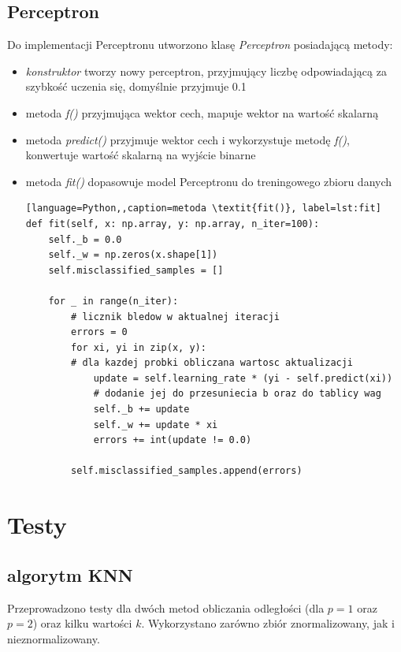 \documentclass[12pt,a4paper]{article}
\begin{document}
        \subsection{Perceptron}
            Do implementacji Perceptronu utworzono klasę \textit{Perceptron} posiadającą metody:
	        \begin{itemize}
	            \item \textit{konstruktor} tworzy nowy perceptron, przyjmujący liczbę odpowiadającą za szybkość uczenia się, domyślnie przyjmuje 0.1
	            \item metoda \textit{f()} przyjmująca wektor cech, mapuje wektor na wartość skalarną
	            \item metoda \textit{predict()} przyjmuje wektor cech i wykorzystuje metodę \textit{f()}, konwertuje wartość skalarną na wyjście binarne
	            \item metoda \textit{fit()} dopasowuje model Perceptronu do treningowego zbioru danych
	   \begin{lstlisting}[language=Python,,caption=metoda \textit{fit()}, label=lst:fit]
def fit(self, x: np.array, y: np.array, n_iter=100):
    self._b = 0.0
    self._w = np.zeros(x.shape[1])
    self.misclassified_samples = []

    for _ in range(n_iter):
        # licznik bledow w aktualnej iteracji
        errors = 0
        for xi, yi in zip(x, y):
        # dla kazdej probki obliczana wartosc aktualizacji
            update = self.learning_rate * (yi - self.predict(xi))
            # dodanie jej do przesuniecia b oraz do tablicy wag
            self._b += update
            self._w += update * xi
            errors += int(update != 0.0)

        self.misclassified_samples.append(errors)
        \end{lstlisting}
	            \end{itemize}
        
	\section{Testy}
	
	    \subsection{algorytm KNN}
            Przeprowadzono testy dla dwóch metod obliczania odległości (dla $p=1$ oraz $p=2$) oraz kilku wartości $k$. Wykorzystano zarówno zbiór znormalizowany, jak i nieznormalizowany.
            
\end{document}
